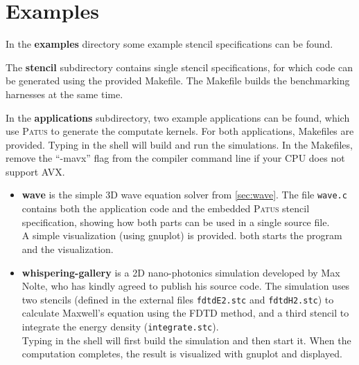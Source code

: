 \section{Examples}
\label{sec:examples}

In the \textbf{examples} directory some example stencil specifications can be found.

The \textbf{stencil} subdirectory contains single stencil specifications, for which
code can be generated using the provided Makefile. The Makefile builds the benchmarking
harnesses at the same time.

In the \textbf{applications} subdirectory, two example applications can be found, which use
\textsc{Patus} to generate the computate kernels.
For both applications, Makefiles are provided. Typing  in the shell will
build and run the simulations.
In the Makefiles, remove the ``-mavx'' flag from the compiler command line if your CPU does not support AVX.

\begin{itemize}
  \item \textbf{wave} is the simple 3D wave equation solver from \ref{sec:wave}.
    The file \texttt{wave.c} contains both the application code and the embedded
    \textsc{Patus} stencil specification, showing how both parts can be used in a
    single source file.\\
    A simple visualization (using gnuplot) is provided.  both starts
    the program and the visualization.
    
  \item \textbf{whispering-gallery} is a 2D nano-photonics simulation developed by Max Nolte,
    who has kindly agreed to publish his source code.
    The simulation uses two stencils (defined in the external files \texttt{fdtdE2.stc}
    and \texttt{fdtdH2.stc}) to calculate Maxwell's equation using the FDTD method,
    and a third stencil to integrate the energy density (\texttt{integrate.stc}).\\
    Typing  in the shell will first build the simulation and then start it.
    When the computation completes, the result is visualized with gnuplot and displayed.
\end{itemize}

